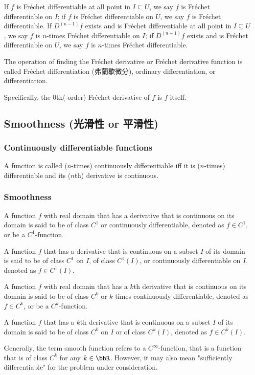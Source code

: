 \documentclass[a4paper,12pt]{report}
\begin{document}
\begin{itemize}
\begin{itemize}
If $f$ is Fréchet differentiable at all point in $I\subseteq U$, we say $f$ is Fréchet differentiable on $I$; if $f$ is Fréchet differentiable on $U$, we say $f$ is Fréchet differentiable. If $D^{(n-1)}f$ exists and is Fréchet differentiable at all point in $I\subseteq U$, we say $f$ is $n$-times Fréchet differentiable on $I$; if $D^{(n-1)}f$ exists and is Fréchet differentiable on $U$, we say $f$ is $n$-times Fréchet differentiable.

The operation of finding the Fréchet derivative or Fréchet derivative function is called Fréchet differentiation (弗蘭歇微分), ordinary differentiation, or differentiation.

Specifically, the $0$th(-order) Fréchet derivative of $f$ is $f$ itself.
\subsection{Smoothness (光滑性 or 平滑性)}
\subsubsection{Continuously differentiable functions}
A function is called ($n$-times) continuously differentiable iff it is ($n$-times) differentiable and its ($n$th) derivative is continuous.
\subsubsection{Smoothness}
A function $f$ with real domain that has a derivative that is continuous on its domain is said to be of class $C^1$ or continuously differentiable, denoted as $f\in C^1$, or be a $C^1$-function.

A function $f$ that has a derivative that is continuous on a subset $I$ of its domain is said to be of class $C^1$ on $I$, of class $C^1(I)$, or continuously differentiable on $I$, denoted as $f\in C^1(I)$.

A function $f$ with real domain that has a $k$th derivative that is continuous on its domain is said to be of class $C^k$ or $k$-times continuously differentiable, denoted as $f\in C^k$, or be a $C^k$-function.

A function $f$ that has a $k$th derivative that is continuous on a subset $I$ of its domain is said to be of class $C^k$ on $I$ or of class $C^k(I)$, denoted as $f\in C^k(I)$.

Generally, the term smooth function refers to a $C^{\infty}$-function, that is a function that is of class $C^k$ for any $k\in\bbR$. However, it may also mean "sufficiently differentiable" for the problem under consideration.

\end{itemize}
\end{itemize}
\end{document}
